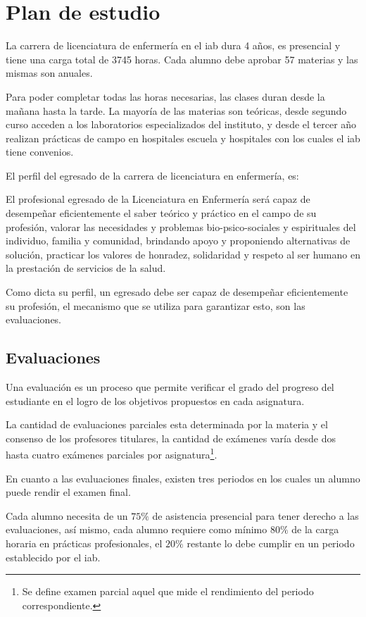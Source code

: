 \section{Plan de estudio}
\label{sec:plan_estudio}

La carrera de licenciatura de enfermería en el \Gls{iab} dura 4 años, es
presencial y tiene una carga total de 3745 horas. Cada alumno debe aprobar 57
materias y las mismas son anuales.

Para poder completar todas las horas necesarias, las clases duran desde la
mañana hasta la tarde. La mayoría de las materias son teóricas, desde segundo
curso acceden a los laboratorios especializados del instituto, y desde el tercer
año realizan prácticas de campo en hospitales escuela y hospitales con los
cuales el \Gls{iab} tiene convenios.

El perfil del egresado de la carrera de licenciatura en enfermería,
es\cite{iab:enfermeria}:

\begin{displayquote}

El profesional egresado de la Licenciatura en Enfermería será capaz de
desempeñar eficientemente el saber teórico y práctico en el campo de su
profesión, valorar las necesidades y problemas bio-psico-sociales y espirituales
del individuo, familia y comunidad, brindando apoyo y proponiendo alternativas
de solución, practicar los valores de honradez, solidaridad y respeto al ser
humano en la prestación de servicios de la salud.

\end{displayquote}

Como dicta su perfil, un egresado debe ser capaz de desempeñar eficientemente su
profesión, el mecanismo que se utiliza para garantizar esto, son las
evaluaciones.

\subsection{Evaluaciones}

Una evaluación es un proceso que permite verificar el grado del progreso del
estudiante en el logro de los objetivos propuestos en cada
asignatura\cite{iab:est_enfemeria}.

La cantidad de evaluaciones parciales esta determinada por la materia y el
consenso de los profesores titulares\cite{iab:est_enfemeria}, la cantidad de
exámenes varía desde dos hasta cuatro exámenes parciales por
asignatura\footnote{Se define examen parcial aquel que mide el rendimiento del
    periodo correspondiente\cite{iab:est_enfemeria}.}.

En cuanto a las evaluaciones finales, existen tres periodos en los cuales un
alumno puede rendir el examen final.

Cada alumno necesita de un $75\%$ de asistencia presencial para tener derecho a
las evaluaciones, así mismo, cada alumno requiere como mínimo $80\%$ de la carga
horaria en prácticas profesionales, el $20\%$ restante lo debe cumplir en un
periodo establecido por el \Gls{iab}.
